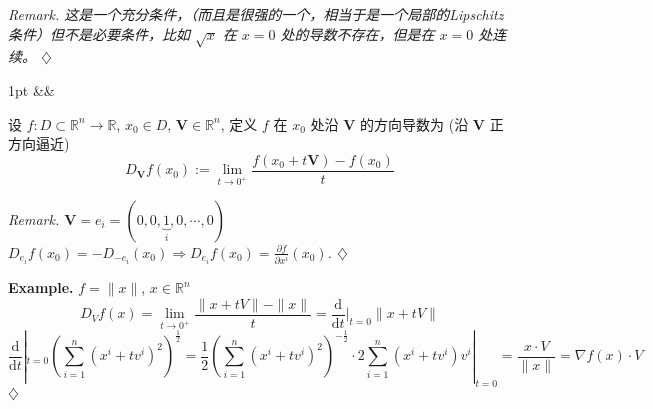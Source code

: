 \documentclass[a4paper]{article}
\newcommand{\di}{\mathrm{d}}
\newcommand{\R}{\mathbb{R}}
\newenvironment{formal}[1][]{%
\def\FrameCommand{%
\hspace{1pt}%
{\color{formalline}\vrule width 2pt}%
{\color{formalshade}\vrule width 4pt}%
\colorbox{formalshade}%
}%
\MakeFramed{\advance\hsize-\width\FrameRestore}%
\noindent
\hspace{-4.55pt}%
\begin{adjustwidth}{}{1pt}%
\setlength{\parindent}{0pt}%
\vspace{3pt}%
\ifx&#1&\else %
\textbf{#1}\par
\vspace{1pt}%
\fi }{%
\vspace{2pt}%
\end{adjustwidth}\endMakeFramed%
}
\newenvironment{remark}{%
\par
\smallskip
\noindent
\itshape Remark. }{%
\smallskip
\hfill$\diamondsuit$ \par}
\newenvironment{example}{%
\par
\smallskip
\noindent
\textbf{Example.} }{%
\smallskip
\hfill$\diamondsuit$ \par}
\begin{document}
    \begin{remark}
        这是一个充分条件，（而且是很强的一个，相当于是一个局部的Lipschitz条件）但不是必要条件，比如
        $\sqrt{x}$ 在 $x=0$ 处的导数不存在，但是在 $x=0$ 处连续。
    \end{remark}

    \begin{formal}
        [方向导数] 设 $f: D \subset \R^{n}\to \R$, $x_{0}\in D$, $\boldsymbol{V}\in
        \R^{n}$, 定义 $f$ 在 $x_{0}$ 处沿 $\boldsymbol{V}$ 的方向导数为 (沿 $\boldsymbol
        {V}$ 正方向逼近)
        \[
            D_{\boldsymbol{V}}f(x_{0}) := \lim_{t \to 0^+}\frac{f(x_{0}+ t\boldsymbol{V})
            - f(x_{0})}{t}
        \]
    \end{formal}

    \begin{remark}
        $\boldsymbol{V}= e_{i}= (0, 0, \underbrace{1}_{i}, 0, \cdots, 0)$ $D_{e_i}
        f(x_{0}) = -D_{-e_i}(x_{0}) \Rightarrow D_{e_i}f(x_{0}) = \frac{\partial
        f}{\partial x^{i}}(x_{0})$.
    \end{remark}

    \begin{example}
        $f = \|x\|$, $x \in \R^{n}$
        \[
            D_{V}f(x) = \lim_{t \to 0^+}\frac{\|x + tV\| - \|x\|}{t}= \frac{\di}{\di
            t}|_{t=0}\|x + tV\|
        \]
        \[
            \frac{\di}{\di t}|_{t=0}\left( \sum_{i=1}^{n}(x^{i}+ tv^{i})^{2}\right
            )^{\frac{1}{2}}= \frac{1}{2}\left( \sum_{i=1}^{n}(x^{i}+ tv^{i})^{2}\right
            )^{-\frac{1}{2}}\cdot 2 \sum_{i=1}^{n}(x^{i}+ tv^{i}) v^{i}|_{t=0}= \frac{x
            \cdot V}{\|x\|}= \nabla f(x) \cdot V
        \]
    \end{example}
\end{document}
